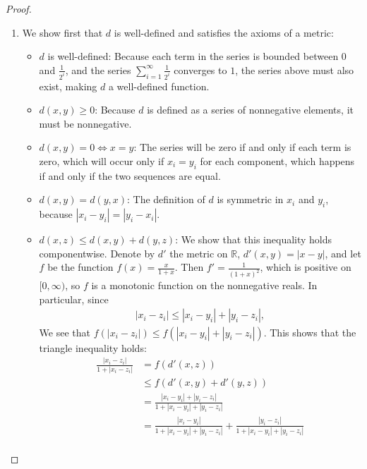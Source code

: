 \documentclass[12pt]{article}
\newcommand{\R}{\mathbb{R}}
\theoremstyle{definition}
\begin{document}
\begin{proof}
	\begin{enumerate}[label=(\roman*)]
		\item	We show first that $d$ is well-defined and satisfies the axioms of a metric:
	\begin{itemize}
		\item $d$ is well-defined: Because each term in the series is bounded between $0 $ and $\frac{1}{2^i}$, and the series $\sum_{i=1}^\infty \frac{1}{2^i}$ converges to $1$, the series above must also exist, making $d$ a well-defined function.
		\item $d(x,y) \geq 0$: Because $d$ is defined as a series of nonnegative elements, it must be nonnegative.
		\item $d(x,y) = 0 \iff x = y$: The series will be zero if and only if each term is zero, which will occur only if $x_i = y_i$ for each component, which happens if and only if the two sequences are equal.
		\item $d(x,y) = d(y,x)$: The definition of $d$ is symmetric in $x_i$ and $y_i$, because $\left \lvert { x_i - y_i } \right \lvert  = \left \lvert { y_i - x_i } \right \lvert $.
		\item $d(x,z) \leq d(x,y) + d(y,z)$: We show that this inequality holds componentwise. Denote by $d'$ the metric on $\R$, $d'(x,y) = \left \lvert { x - y } \right \lvert $, and let $f$ be the function $f(x) = \frac{x}{1+x}$. Then $f' = \frac{1}{(1+x)^2}$, which is positive on $[0, \infty)$, so $f$ is a monotonic function on the nonnegative reals. In particular, since 
			\begin{align*}
				\left \lvert { x_i - z_i } \right \lvert \leq \left \lvert { x_i - y_i } \right \lvert  + \left \lvert { y_i - z_i } \right \lvert,
			\end{align*}
			We see that $f(\left \lvert { x_i - z_i } \right \lvert ) \leq f(\left \lvert { x_i - y_i } \right \lvert  + \left \lvert { y_i - z_i } \right \lvert )$. This shows that the triangle inequality holds:
			\begin{align*}
				\frac{\left \lvert { x_i - z_i } \right \lvert }{1 + \left \lvert { x_i - z_i } \right \lvert }
				&= f(d'(x,z))\\	
				&\leq f(d'(x,y) + d'(y,z))\\
			&= \frac{\left \lvert { x_i - y_i } \right \lvert + \left \lvert { y_i - z_i } \right \lvert}{1+ \left \lvert { x_i - y_i } \right \lvert + \left \lvert { y_i - z_i } \right \lvert }\\
			&= \frac{\left \lvert { x_i - y_i } \right \lvert }{1 + \left \lvert { x_i - y_i } \right \lvert  + \left \lvert { y_i - z_i } \right \lvert } + \frac{\left \lvert { y_i - z_i } \right \lvert }{ 1 + \left \lvert { x_i - y_i } \right \lvert + \left \lvert { y_i - z_i } \right \lvert }\\

\end{align*}
\end{itemize}
\end{enumerate}
\end{proof}
\end{document}
